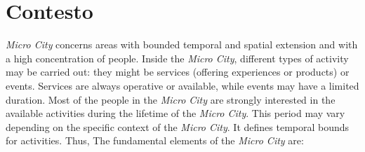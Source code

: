 \section{Contesto}
\textit{Micro City} concerns areas with bounded temporal and spatial extension and with a high concentration of people.
Inside the \textit{Micro City}, different types of activity may be carried out: they might be services (offering experiences or products) or events. Services are always operative or available, while events may have a limited duration.
Most of the people in the \textit{Micro City} are strongly interested in the available activities during the lifetime of the \textit{Micro City}. This period may vary depending on the specific context of the \textit{Micro City}. It defines temporal bounds for activities.
Thus, The fundamental elements of the \textit{Micro City} are:
